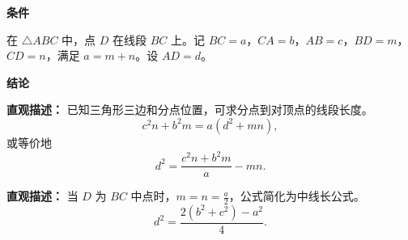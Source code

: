 \begin{statementbox}

	\textbf{\textcolor{CStatement}{条件}}
	\begin{description}[style=nextline, leftmargin=2.8em, labelsep=0.5em, itemsep=0.35em]
		\item[\textbf{\textcolor{CStatement}{条件 1（点分线段）：}}] 在 $\triangle ABC$ 中，点 $D$ 在线段 $BC$ 上。记 $BC=a$，$CA=b$，$AB=c$，$BD=m$，$CD=n$，满足 $a=m+n$。设 $AD=d$。
	\end{description}

	\textbf{\textcolor{CStatement}{结论}}
	\begin{description}[style=nextline, leftmargin=2.8em, labelsep=0.5em, itemsep=0.45em]
		\item[\textbf{\textcolor{CStatement}{结论一（斯特瓦尔特定理）：}}]
			\textbf{\textcolor{CStatement}{直观描述：}}
			已知三角形三边和分点位置，可求分点到对顶点的线段长度。
			\[
				c^{2}n + b^{2}m = a(d^{2}+mn),
			\]
			或等价地
			\[
				d^{2} = \frac{c^{2}n + b^{2}m}{a} - mn.
			\]

		\item[\textbf{\textcolor{CStatement}{常见变形（中线公式）：}}]
			\textbf{\textcolor{CStatement}{直观描述：}}
			当 $D$ 为 $BC$ 中点时，$m=n=\frac{a}{2}$，公式简化为中线长公式。
			\[
				d^{2} = \frac{2(b^{2}+c^{2}) - a^{2}}{4}.
			\]
	\end{description}

\end{statementbox}
